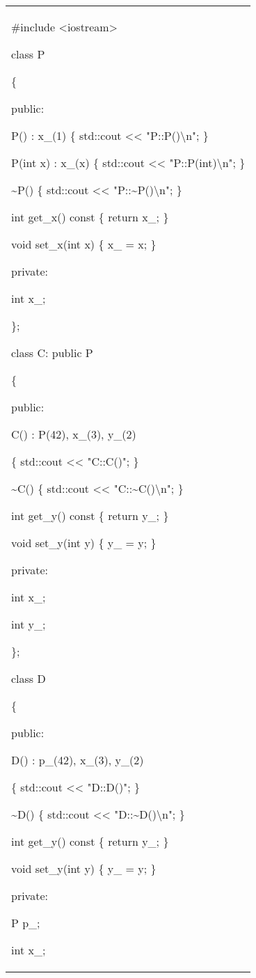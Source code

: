 \documentclass[
]{article}
\begin{document}
\begin{longtable}[]{@{}l@{}}
\toprule
\endhead
\begin{minipage}[t]{0.97\columnwidth}\raggedright
\#include \textless iostream\textgreater{}

class P

\{

public:

P() : x\_(1) \{ std::cout \textless\textless{} "P::P()\textbackslash n";
\}

P(int x) : x\_(x) \{ std::cout \textless\textless{}
"P::P(int)\textbackslash n"; \}

\textasciitilde P() \{ std::cout \textless\textless{}
"P::\textasciitilde P()\textbackslash n"; \}

int get\_x() const \{ return x\_; \}

void set\_x(int x) \{ x\_ = x; \}

private:

int x\_;

\};

class C: public P

\{

public:

C() : P(42), x\_(3), y\_(2)

\{ std::cout \textless\textless{} "C::C()"; \}

\textasciitilde C() \{ std::cout \textless\textless{}
"C::\textasciitilde C()\textbackslash n"; \}

int get\_y() const \{ return y\_; \}

void set\_y(int y) \{ y\_ = y; \}

private:

int x\_;

int y\_;

\};

class D

\{

public:

D() : p\_(42), x\_(3), y\_(2)

\{ std::cout \textless\textless{} "D::D()"; \}

\textasciitilde D() \{ std::cout \textless\textless{}
"D::\textasciitilde D()\textbackslash n"; \}

int get\_y() const \{ return y\_; \}

void set\_y(int y) \{ y\_ = y; \}

private:

P p\_;

int x\_;


\end{minipage}
\end{longtable}
\end{document}
